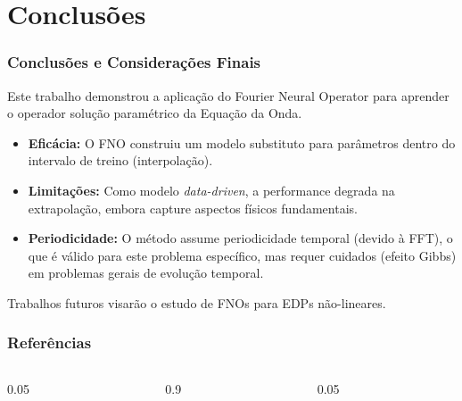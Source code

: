 \documentclass[usenames,dvipsnames,brazil,aspectratio=169]{beamer}
\begin{document}
\section{Conclusões}

\begin{frame}[t]
    \frametitle{Conclusões e Considerações Finais}
    Este trabalho demonstrou a aplicação do Fourier Neural Operator para aprender o operador solução paramétrico da Equação da Onda.

    \vspace{0.5cm}
    \begin{itemize}
        \item \textbf{Eficácia:} O FNO construiu um modelo substituto para parâmetros dentro do intervalo de treino (interpolação).
        \item \textbf{Limitações:} Como modelo \textit{data-driven}, a performance degrada na extrapolação, embora capture aspectos físicos fundamentais.
        \item \textbf{Periodicidade:} O método assume periodicidade temporal (devido à FFT), o que é válido para este problema específico, mas requer cuidados (efeito Gibbs) em problemas gerais de evolução temporal.
    \end{itemize}

    \vspace{0.5cm}
    Trabalhos futuros visarão o estudo de FNOs para EDPs não-lineares.
\end{frame}

\begin{frame}[allowframebreaks]
    \frametitle{Referências}
    \begin{columns}[T]
        \begin{column}{0.05\textwidth}\end{column} 
        \begin{column}{0.9\textwidth}
            \footnotesize
            \printbibliography[heading=none]
        \end{column}
        \begin{column}{0.05\textwidth}\end{column} 
    \end{columns}
\end{frame}
\end{document}
